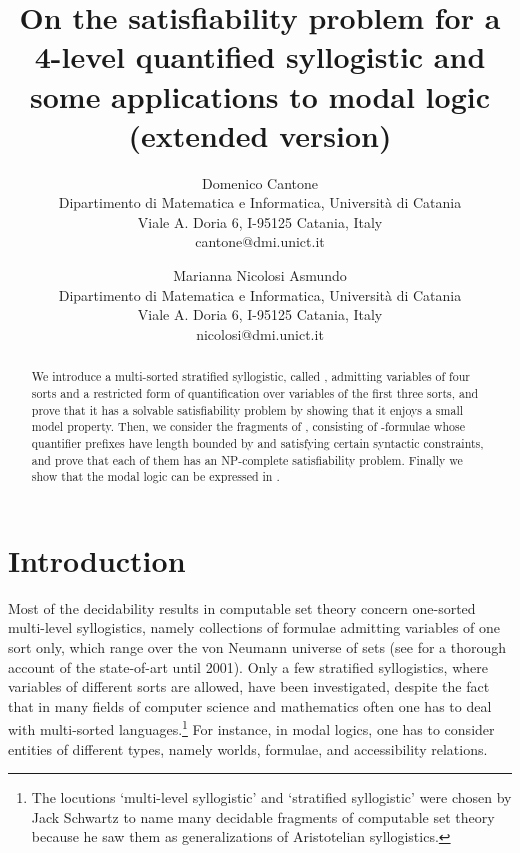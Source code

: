 \documentclass{fundam}
\begin{document}
\title{On the satisfiability problem for a 4-level quantified syllogistic and some applications to modal logic (extended version)}

\author{Domenico Cantone \\
Dipartimento di Matematica e Informatica, Universit\`a di
Catania\\
      Viale A. Doria 6, I-95125 Catania, Italy \\
cantone@dmi.unict.it\\
\and Marianna Nicolosi Asmundo \\
Dipartimento di Matematica e Informatica, Universit\`a di
Catania\\
      Viale A. Doria 6, I-95125 Catania, Italy \\
      nicolosi@dmi.unict.it}
\maketitle




\begin{abstract}
We introduce a multi-sorted stratified syllogistic, called ,
admitting variables of four sorts and a restricted form of
quantification over variables of the first three sorts, and prove that
it has a solvable satisfiability problem by showing that it enjoys a
small model property.  Then, we consider the fragments  of
, consisting of -formulae whose quantifier prefixes
have length bounded by  and satisfying certain syntactic
constraints, and prove that each of them has an \textsf{NP}-complete
satisfiability problem.  Finally we show that the modal logic 
can be expressed in .
\end{abstract}

\section{Introduction}
Most of the decidability results in computable set theory concern
one-sorted multi-level syllogistics, namely collections of formulae
admitting variables of one sort only, which range over the von Neumann
universe of sets (see \cite{CFO89,COO01} for a thorough account of the
state-of-art until 2001).
Only a few stratified syllogistics, where
variables of different sorts are allowed, have been investigated,
despite the fact that in many fields of computer science and
mathematics often one has to deal with multi-sorted languages.\footnote{The locutions `multi-level syllogistic' and `stratified syllogistic' were chosen by Jack Schwartz to
name many decidable fragments of computable set theory because he saw them as generalizations of Aristotelian syllogistics.}
For instance, in modal logics, one has to consider entities of different
types, namely worlds, formulae, and accessibility relations.
\end{document}
